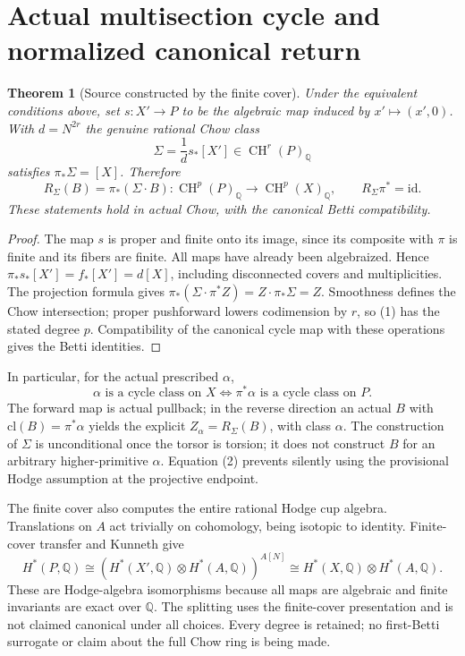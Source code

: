 \documentclass[11pt]{article}
\newtheorem{theorem}{Theorem}
\newcommand{\Q}{\mathbb Q}
\newcommand{\CH}{\operatorname{CH}}
\begin{document}
\section{Actual multisection cycle and normalized canonical return}
\begin{theorem}[Source constructed by the finite cover]\label{thm:cycle}
Under the equivalent conditions above, set $s:X'\to P$ to be the algebraic
map induced by $x'\mapsto(x',0)$. With $d=N^{2r}$ the genuine rational
Chow class
\[
 \Sigma=\frac1d s_*[X']\in\CH^r(P)_\Q
\]
satisfies $\pi_*\Sigma=[X]$. Therefore
\[
 R_\Sigma(B)=\pi_*(\Sigma\cdot B):\CH^p(P)_\Q\to\CH^p(X)_\Q,
 \qquad R_\Sigma\pi^*=\mathrm{id}.                 \tag{1}
\]
These statements hold in actual Chow, with the canonical Betti compatibility.
\end{theorem}
\begin{proof}
The map $s$ is proper and finite onto its image, since its composite with
$\pi$ is finite and its fibers are finite. All maps have already been
algebraized. Hence
$\pi_*s_*[X']=f_*[X']=d[X]$, including disconnected covers and multiplicities.
The projection formula gives
$\pi_*(\Sigma\cdot\pi^*Z)=Z\cdot\pi_*\Sigma=Z$.
Smoothness defines the Chow intersection; proper pushforward lowers
codimension by $r$, so (1) has the stated degree $p$. Compatibility of the
canonical cycle map with these operations gives the Betti identities.
\end{proof}
In particular, for the actual prescribed $\alpha$,
\[
 \alpha\text{ is a cycle class on }X
 \iff \pi^*\alpha\text{ is a cycle class on }P.       \tag{2}
\]
The forward map is actual pullback; in the reverse direction an actual
$B$ with $\mathrm{cl}(B)=\pi^*\alpha$ yields the explicit
$Z_\alpha=R_\Sigma(B)$, with class $\alpha$. The construction of $\Sigma$
is unconditional once the torsor is torsion; it does not construct $B$
for an arbitrary higher-primitive $\alpha$. Equation (2) prevents silently
using the provisional Hodge assumption at the projective endpoint.

The finite cover also computes the entire rational Hodge cup algebra.
Translations on $A$ act trivially on cohomology, being isotopic to identity.
Finite-cover transfer and Kunneth give
\[
 H^*(P,\Q)\cong
 (H^*(X',\Q)\otimes H^*(A,\Q))^{A[N]}
 \cong H^*(X,\Q)\otimes H^*(A,\Q).                 \tag{3}
\]
These are Hodge-algebra isomorphisms because all maps are algebraic and
finite invariants are exact over $\Q$. The splitting uses the finite-cover
presentation and is not claimed canonical under all choices. Every degree
is retained; no first-Betti surrogate or claim about the full Chow ring is
being made.
\end{document}
